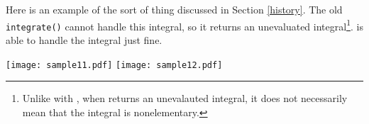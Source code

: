 Here is an example of the sort of thing discussed in Section
\ref{history}.  The old \texttt{integrate()} cannot handle this
integral, so it returns an unevaluated integral\footnote{Unlike with
\rischintegrate{}, when  returns an unevalauted
integral, it does not necessarily mean that the integral is
nonelementary.}.  \rischintegrate{} is able to handle the integral just
fine.

\begin{flushleft}
\texttt{[image: sample11.pdf]}
\texttt{[image: sample12.pdf]}
\end{flushleft}
